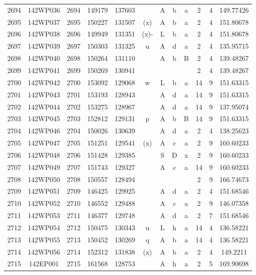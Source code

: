 \begin{tabular}{|*{12}{c|}}
2694 & 142WP036 & 2694 & 149179 & 137603 &  & A & b & a & 2 & 4 & 149.77426 \\ 
2695 & 142WP037 & 2695 & 150227 & 131507 & (x) & A & b & a & 2 & 4 & 151.80678 \\ 
2696 & 142WP038 & 2696 & 149949 & 131351 & (x)- & L & b & a & 2 & 4 & 151.80678 \\ 
2697 & 142WP039 & 2697 & 150303 & 131325 & u & A & d & a & 2 & 4 & 135.95715 \\ 
2698 & 142WP040 & 2698 & 150264 & 131110 &  & A & b & B & 2 & 4 & 139.48267 \\ 
2699 & 142WP041 & 2699 & 150269 & 130941 &  &  &  &  & 2 & 4 & 139.48267 \\ 
2700 & 142WP042 & 2700 & 153092 & 129068 & w & L & b & a & 14 & 9 & 151.63315 \\ 
2701 & 142WP043 & 2701 & 153193 & 128943 &  & A & d & a & 14 & 9 & 151.63315 \\ 
2702 & 142WP044 & 2702 & 153275 & 128967 &  & A & d & a & 14 & 9 & 137.95074 \\ 
2703 & 142WP045 & 2703 & 152812 & 129131 & p & A & b & B & 14 & 9 & 151.63315 \\ 
2704 & 142WP046 & 2704 & 150026 & 130639 &  & A & d & a & 2 & 4 & 138.25623 \\ 
2705 & 142WP047 & 2705 & 151251 & 129541 & (x) & A & c & a & 2 & 9 & 160.60233 \\ 
2706 & 142WP048 & 2706 & 151428 & 129385 &  & S & D & x & 2 & 9 & 160.60233 \\ 
2707 & 142WP049 & 2707 & 151743 & 129327 &  & A & c & a & 14 & 9 & 160.60233 \\ 
2708 & 142WP050 & 2708 & 150557 & 128494 &  &  &  &  & 2 & 9 & 166.74673 \\ 
2709 & 142WP051 & 2709 & 146425 & 129925 &  & A & d & a & 2 & 4 & 151.68546 \\ 
2710 & 142WP052 & 2710 & 146552 & 129488 &  & A & c & a & 2 & 9 & 146.07358 \\ 
2711 & 142WP053 & 2711 & 146377 & 129748 &  & A & d & a & 2 & 7 & 151.68546 \\ 
2712 & 142WP054 & 2712 & 150475 & 130343 & u & L & h & a & 14 & 4 & 136.58221 \\ 
2713 & 142WP055 & 2713 & 150452 & 130269 & q & A & b & a & 14 & 4 & 136.58221 \\ 
2714 & 142WP056 & 2714 & 152312 & 131838 & (x) & A & b & a & 2 & 4 & 149.2211 \\ 
2715 & 142EP001 & 2715 & 161568 & 128753 &  & A & h & a & 2 & 5 & 169.90698 \\ 

\end{tabular}
